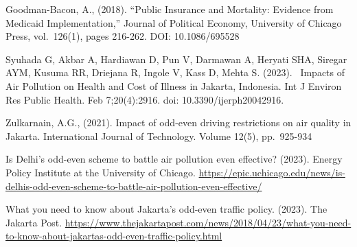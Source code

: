 \documentclass[AEJ]{AEA}
\begin{document}
Goodman-Bacon, A., (2018). ``Public Insurance and Mortality: Evidence
from Medicaid Implementation,'' Journal of Political Economy, University
of Chicago Press, vol.~126(1), pages 216-262. DOI: 10.1086/695528

Syuhada G, Akbar A, Hardiawan D, Pun V, Darmawan A, Heryati SHA, Siregar
AYM, Kusuma RR, Driejana R, Ingole V, Kass D, Mehta S. (2023).~ Impacts
of Air Pollution on Health and Cost of Illness in Jakarta, Indonesia.
Int J Environ Res Public Health. Feb 7;20(4):2916. doi:
10.3390/ijerph20042916.~

Zulkarnain, A.G., (2021). Impact of odd-even driving restrictions on air
quality in Jakarta. International Journal of Technology. Volume 12(5),
pp.~925-934

Is Delhi's odd-even scheme to battle air pollution even effective?
(2023). Energy Policy Institute at the University of Chicago.
\url{https://epic.uchicago.edu/news/is-delhis-odd-even-scheme-to-battle-air-pollution-even-effective/}

What you need to know about Jakarta's odd-even traffic policy. (2023).
The Jakarta Post.
\url{https://www.thejakartapost.com/news/2018/04/23/what-you-need-to-know-about-jakartas-odd-even-traffic-policy.html}
\end{document}
